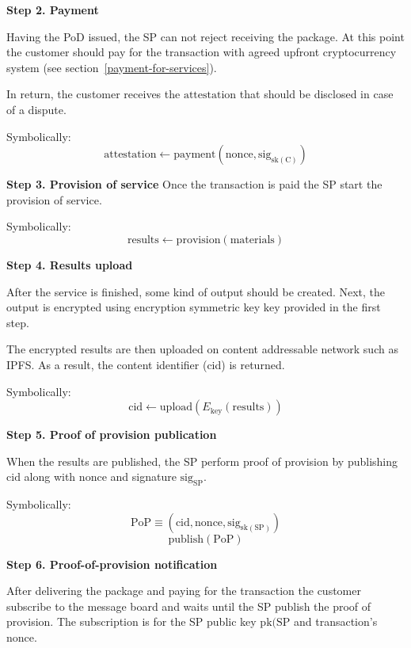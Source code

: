 \documentclass{ieeeaccess}
\begin{document}
\noindent \textbf
{Step 2. Payment}\label{step-2-payment}

Having the PoD issued, the SP can not reject receiving the package. At this point the
customer should pay for the transaction with agreed upfront cryptocurrency system (see section~\ref{payment-for-services}).

In return, the customer receives the $\mathrm{attestation}$ that should be disclosed in case of a dispute.

Symbolically: \[
\mathrm{attestation} \gets \mathrm{payment}(\mathrm{nonce}, \mathrm{sig}_{\mathrm{sk}(\mathrm{C})})
\]

\noindent \textbf
{Step 3. Provision of service}\label{step-3-provision-of-service} 
Once the transaction is paid the SP start the provision of service.

Symbolically: \[
\mathrm{results} \gets \mathrm{provision}(\mathrm{materials})
\]

\noindent \textbf
{Step 4. Results upload}\label{step-4-results-upload}

After the service is finished, some kind of output should be created. Next, the output is encrypted using encryption symmetric key $\mathrm{key}$ provided in the first step.

The encrypted results are then uploaded on content addressable network such as IPFS. As a result, the content identifier (cid) is returned.

Symbolically: 
\[
\mathrm{cid} \gets \mathrm{upload}(E_{\mathrm{key}}(\mathrm{results}))
\]

\noindent \textbf
{Step 5. Proof of provision publication}\label{step-5-proof-of-provision-publication}

When the results are published, the SP perform proof of provision by publishing $\mathrm{cid}$ along with $\mathrm{nonce}$ and signature $\mathrm{sig}_\mathrm{SP}$.

Symbolically: 
\[\mathrm{PoP} \equiv (\mathrm{cid}, \mathrm{nonce}, \mathrm{sig}_{\mathrm{sk}(\mathrm{SP})})\]
\[\mathrm{publish}(\mathrm{PoP})\]

\noindent \textbf
{Step 6. Proof-of-provision notification}\label{step-6-proof-of-provision-notification}

After delivering the package and paying for the transaction the customer subscribe to the message board and waits until the SP publish the proof of provision. The subscription is for the SP public key $\mathrm{pk}(\mathrm{SP}$ and transaction's $\mathrm{nonce}$.
\end{document}

